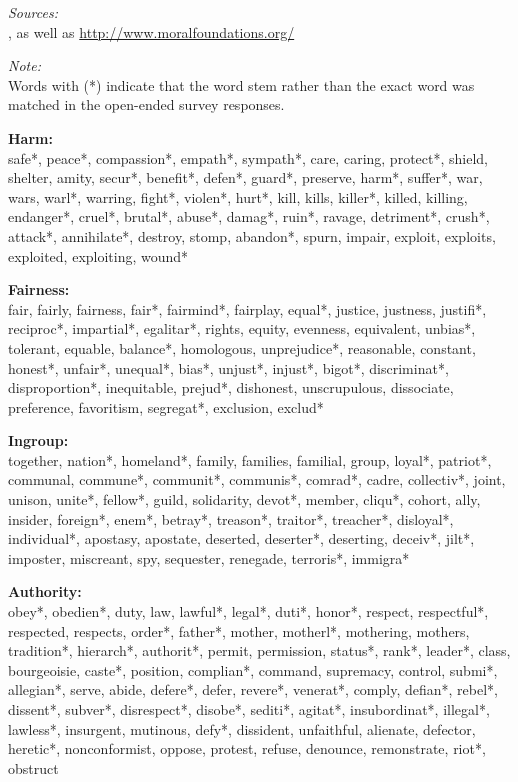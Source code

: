\documentclass[12pt]{paper}
\begin{document}
\textit{Sources:}\\
\citet{graham2009liberals}, as well as \url{http://www.moralfoundations.org/}
\vspace{.5cm}

\textit{Note:}\\
Words with (*) indicate that the word stem rather than the exact word was matched in the open-ended survey responses.
\vspace{.5cm}

\textbf{Harm:}\\
safe*, peace*, compassion*, empath*, sympath*, care, caring, protect*, shield, shelter, amity, secur*, benefit*, defen*, guard*, preserve, harm*, suffer*, war, wars, warl*, warring, fight*, violen*, hurt*, kill, kills, killer*, killed, killing, endanger*, cruel*, brutal*, abuse*, damag*, ruin*, ravage, detriment*, crush*, attack*, annihilate*, destroy, stomp, abandon*, spurn, impair, exploit, exploits, exploited, exploiting, wound*
\vspace{.5cm}

\textbf{Fairness:}\\
fair, fairly, fairness, fair*, fairmind*, fairplay, equal*, justice, justness, justifi*, reciproc*, impartial*, egalitar*, rights, equity, evenness, equivalent, unbias*, tolerant, equable, balance*, homologous, unprejudice*, reasonable, constant, honest*, unfair*, unequal*, bias*, unjust*, injust*, bigot*, discriminat*, disproportion*, inequitable, prejud*, dishonest, unscrupulous, dissociate, preference, favoritism, segregat*, exclusion, exclud*
\vspace{.5cm}

\textbf{Ingroup:}\\
together, nation*, homeland*, family, families, familial, group, loyal*, patriot*, communal, commune*, communit*, communis*, comrad*, cadre, collectiv*, joint, unison, unite*, fellow*, guild, solidarity, devot*, member, cliqu*, cohort, ally, insider, foreign*, enem*, betray*, treason*, traitor*, treacher*, disloyal*, individual*, apostasy, apostate, deserted, deserter*, deserting, deceiv*, jilt*, imposter, miscreant, spy, sequester, renegade, terroris*, immigra*
\vspace{.5cm}

\textbf{Authority:}\\
obey*, obedien*, duty, law, lawful*, legal*, duti*, honor*, respect, respectful*, respected, respects, order*, father*, mother, motherl*, mothering, mothers, tradition*, hierarch*, authorit*, permit, permission, status*, rank*, leader*, class, bourgeoisie, caste*, position, complian*, command, supremacy, control, submi*, allegian*, serve, abide, defere*, defer, revere*, venerat*, comply, defian*, rebel*, dissent*, subver*, disrespect*, disobe*, sediti*, agitat*, insubordinat*, illegal*, lawless*, insurgent, mutinous, defy*, dissident, unfaithful, alienate, defector, heretic*, nonconformist, oppose, protest, refuse, denounce, remonstrate, riot*, obstruct
\vspace{.5cm}
\end{document}
